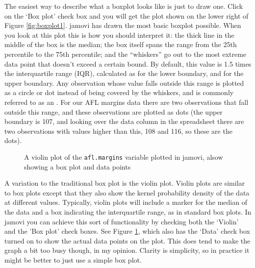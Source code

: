 The easiest way to describe what a boxplot looks like is just to draw one. Click on the `Box plot' check box and you will get the plot shown on the lower right of Figure \ref{fig:boxplot1}. jamovi has drawn the most basic boxplot possible. When you look at this plot this is how you should interpret it: the thick line in the middle of the box is the median; the box itself spans the range from the 25th percentile to the 75th percentile; and the ``whiskers'' go out to the most extreme data point that doesn't exceed a certain bound. By default, this value is 1.5 times the interquartile range (IQR), calculated as  for the lower boundary, and  for the upper boundary. Any observation whose value falls outside this range is plotted as a circle or dot instead of being covered by the whiskers, and is commonly referred to as an . For our AFL margins data there are two observations that fall outside this range, and these observations are plotted as dots (the upper boundary is 107, and looking over the data column in the spreadsheet there are two observations with values higher than this, 108 and 116, so these are the dots). 


\begin{figure}[!!htb]
\begin{center}
\caption{A violin plot of the \texttt{afl.margins} variable plotted in jamovi, alsow showing a box plot and data points}
\label{fig:boxplot2}
\HR
\end{center}
\end{figure}

A variation to the traditional box plot is the violin plot. Violin plots are similar to box plots except that they also show the kernel probability density of the data at different values. Typically, violin plots will include a marker for the median of the data and a box indicating the interquartile range, as in standard box plots. In jamovi you can achieve this sort of functionality by checking both the `Violin' and the 'Box plot' check boxes. See Figure \ref{fig:boxplot2}, which also has the `Data' check box turned on to show the actual data points on the plot. This does tend to make the graph a bit too busy though, in my opinion. Clarity is simplicity, so in practice it might be better to just use a simple box plot.


